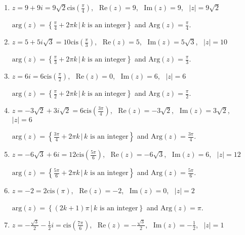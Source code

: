 \begin{enumerate}

\item $z = 9 + 9i = 9\sqrt{2}\text{cis}\left(\frac{\pi}{4}\right)$, \, $\text{Re}(z) = 9$, \, $\text{Im}(z) = 9$, \, $|z| = 9\sqrt{2}$

$\text{arg}(z) = \left\{\frac{\pi}{4} + 2\pi k \, | \, \text{$k$ is an integer} \right\}$ and $\text{Arg}(z) = \frac{\pi}{4}$.

\item $z = 5+5i\sqrt{3} = 10\text{cis}\left(\frac{\pi}{3}\right)$, \, $\text{Re}(z) = 5$, \, $\text{Im}(z) = 5\sqrt{3}$, \, $|z| = 10$

$\text{arg}(z) = \left\{\frac{\pi}{3} + 2\pi k \, | \, \text{$k$ is an integer} \right\}$ and $\text{Arg}(z) = \frac{\pi}{3}$.

\item $z = 6i = 6\text{cis}\left(\frac{\pi}{2}\right)$, \, $\text{Re}(z) = 0$, \, $\text{Im}(z) = 6$, \, $|z| = 6$

$\text{arg}(z) = \left\{\frac{\pi}{2} + 2\pi k \, | \, \text{$k$ is an integer} \right\}$ and $\text{Arg}(z) = \frac{\pi}{2}$.

\item $z = -3\sqrt{2} + 3i\sqrt{2} = 6\text{cis}\left(\frac{3\pi}{4}\right)$, \, $\text{Re}(z) = -3\sqrt{2}$, \, $\text{Im}(z) =3\sqrt{2}$, \, $|z| = 6$

$\text{arg}(z) = \left\{\frac{3\pi}{4} + 2\pi k \, | \, \text{$k$ is an integer} \right\}$ and $\text{Arg}(z) = \frac{3\pi}{4}$.

\item $z =  -6\sqrt{3} + 6i = 12\text{cis}\left(\frac{5\pi}{6}\right)$, \, $\text{Re}(z) = -6\sqrt{3}$, \, $\text{Im}(z) =6$, \, $|z| = 12$

$\text{arg}(z) = \left\{\frac{5\pi}{6} + 2\pi k \, | \, \text{$k$ is an integer} \right\}$ and $\text{Arg}(z) = \frac{5\pi}{6}$.

\item $z =  -2 = 2\text{cis}\left(\pi\right)$, \, $\text{Re}(z) = -2$, \, $\text{Im}(z) =0$, \, $|z| = 2$

$\text{arg}(z) = \left\{(2k+1)\pi \, | \, \text{$k$ is an integer} \right\}$ and $\text{Arg}(z) = \pi$.

\item $z = -\frac{\sqrt{3}}{2} - \frac{1}{2}i = \text{cis}\left(\frac{7\pi}{6}\right)$, \, $\text{Re}(z) = -\frac{\sqrt{3}}{2}$, \, $\text{Im}(z) = -\frac{1}{2}$, \, $|z| = 1$


\end{enumerate}
